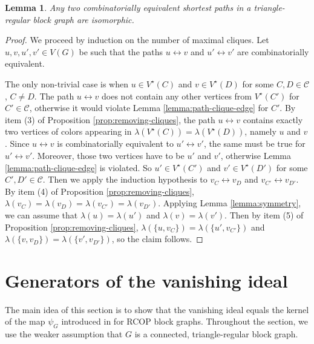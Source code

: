 \documentclass[a4paper, 11pt]{amsart}
\numberwithin{theorem}{section}
\newtheorem{lemma}[theorem]{Lemma}
\begin{document}
\begin{lemma}\label{lemma:comb-equiv-to-iso}
    Any two combinatorially equivalent shortest paths in a triangle-regular block graph are isomorphic.
\end{lemma}
\begin{proof}
    We proceed by induction on the number of maximal cliques. Let $u,v,u',v'\in V(G)$ be such that the paths $u\leftrightarrow v$ and $u'\leftrightarrow v'$ are combinatorially equivalent.

    The only non-trivial case is when $u\in V^\star(C)$ and $v\in
    V^\star(D)$ for some $C,D\in\mathcal C$, $C\neq D$. The path $u
    \leftrightarrow v$ does
    not contain any other vertices from $V^\star(C')$ for 
    $C'\in\mathcal C$, otherwise it would violate Lemma
    \ref{lemma:path-clique-edge} for $C'$. By item (3) of Proposition
    \ref{prop:removing-cliques}, the path $u\leftrightarrow v$
    contains exactly two vertices of colors appearing in
    $\lambda(V^\star (C))=\lambda(V^\star(D))$, namely $u$ and $v$. Since
    $u\leftrightarrow v$ is combinatorially equivalent to
    $u'\leftrightarrow v'$, the same must be true for
    $u'\leftrightarrow v'$. Moreover, those two vertices have to be
    $u'$ and $v'$, otherwise Lemma \ref{lemma:path-clique-edge} is
    violated. So $u'\in V^\star (C')$ and $v'\in V^\star (D')$ for
    some $C',D'\in \mathcal C$. Then we apply the induction hypothesis to
    $v_C\leftrightarrow v_D$ and $v_{C'}\leftrightarrow v_{D'}$. By
    item (4) of Proposition \ref{prop:removing-cliques}, $\lambda(v_C)
    = \lambda(v_D) = \lambda(v_{C'}) = \lambda(v_{D'})$. Applying
    Lemma \ref{lemma:symmetry}, we can assume that $\lambda(u) =
    \lambda(u')$ and $\lambda(v) = \lambda(v')$. Then by item (5) of
    Proposition \ref{prop:removing-cliques}, $\lambda(\{u,v_C\}) =
    \lambda(\{u',v_{C'}\})$ and $\lambda(\{v,v_D\}) =
    \lambda(\{v',v_{D'}\})$, so the claim follows.
\end{proof}

\section{Generators of the vanishing ideal} \label{sec:Gens}

The main idea of this section is to show that the vanishing ideal equals
the kernel of the map $\psi_G$ introduced in \cite{CMMPS23} for RCOP
block graphs. Throughout the section, we use the weaker assumption that
$G$ is a connected, triangle-regular block graph.
\end{document}
